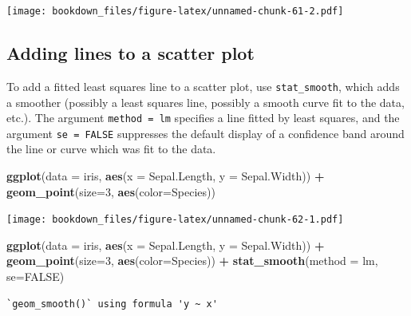 \documentclass[
]{krantz}
\makeatletter
\newenvironment{Shaded}{\begin{snugshade}}{\end{snugshade}}
\newcommand{\DataTypeTok}[1]{\textcolor[rgb]{0.27,0.27,0.27}{#1}}
\newcommand{\DecValTok}[1]{\textcolor[rgb]{0.06,0.06,0.06}{#1}}
\newcommand{\KeywordTok}[1]{\textcolor[rgb]{0.27,0.27,0.27}{\textbf{#1}}}
\newcommand{\NormalTok}[1]{#1}
\newcommand{\OperatorTok}[1]{\textcolor[rgb]{0.43,0.43,0.43}{\textbf{#1}}}
\newcommand{\OtherTok}[1]{\textcolor[rgb]{0.37,0.37,0.37}{#1}}
\newcommand{\StringTok}[1]{\textcolor[rgb]{0.5,0.5,0.5}{#1}}
\newenvironment{kframe}{%
\medskip{}
\setlength{\fboxsep}{.8em}
 \def\at@end@of@kframe{}%
 \ifinner\ifhmode%
  \def\at@end@of@kframe{\end{minipage}}%
  \begin{minipage}{\columnwidth}%
 \fi\fi%
 \def\FrameCommand##1{\hskip\@totalleftmargin \hskip-\fboxsep
 \colorbox{shadecolor}{##1}\hskip-\fboxsep
     \hskip-\linewidth \hskip-\@totalleftmargin \hskip\columnwidth}%
 \MakeFramed {\advance\hsize-\width
   \@totalleftmargin\z@ \linewidth\hsize
   \@setminipage}}%
 {\par\unskip\endMakeFramed%
 \at@end@of@kframe}
\renewenvironment{Shaded}{\begin{kframe}}{\end{kframe}}
\makeatother
\begin{document}
\texttt{[image: bookdown\_files/figure-latex/unnamed-chunk-61-2.pdf]}

\hypertarget{adding-lines-to-a-scatter-plot}{%
\subsection{Adding lines to a scatter plot}\label{adding-lines-to-a-scatter-plot}}

To add a fitted least squares line to a scatter plot, use \texttt{stat\_smooth}, which adds a smoother (possibly a least squares line, possibly a smooth curve fit to the data, etc.). The argument \texttt{method\ =\ lm} specifies a line fitted by least squares, and the argument \texttt{se\ =\ FALSE} suppresses the default display of a confidence band around the line or curve which was fit to the data.

\begin{Shaded}
\begin{Highlighting}[]
\KeywordTok{ggplot}\NormalTok{(}\DataTypeTok{data =}\NormalTok{ iris, }\KeywordTok{aes}\NormalTok{(}\DataTypeTok{x =}\NormalTok{ Sepal.Length, }\DataTypeTok{y =}\NormalTok{ Sepal.Width)) }\OperatorTok{+}\StringTok{ }
\StringTok{    }\KeywordTok{geom\_point}\NormalTok{(}\DataTypeTok{size=}\DecValTok{3}\NormalTok{, }\KeywordTok{aes}\NormalTok{(}\DataTypeTok{color=}\NormalTok{Species))}
\end{Highlighting}
\end{Shaded}

\texttt{[image: bookdown\_files/figure-latex/unnamed-chunk-62-1.pdf]}

\begin{Shaded}
\begin{Highlighting}[]
\KeywordTok{ggplot}\NormalTok{(}\DataTypeTok{data =}\NormalTok{ iris, }\KeywordTok{aes}\NormalTok{(}\DataTypeTok{x =}\NormalTok{ Sepal.Length, }\DataTypeTok{y =}\NormalTok{ Sepal.Width)) }\OperatorTok{+}\StringTok{ }
\StringTok{    }\KeywordTok{geom\_point}\NormalTok{(}\DataTypeTok{size=}\DecValTok{3}\NormalTok{, }\KeywordTok{aes}\NormalTok{(}\DataTypeTok{color=}\NormalTok{Species)) }\OperatorTok{+}\StringTok{ }
\StringTok{    }\KeywordTok{stat\_smooth}\NormalTok{(}\DataTypeTok{method =}\NormalTok{ lm, }\DataTypeTok{se=}\OtherTok{FALSE}\NormalTok{)}
\end{Highlighting}
\end{Shaded}

\begin{verbatim}
`geom_smooth()` using formula 'y ~ x'
\end{verbatim}
\end{document}
